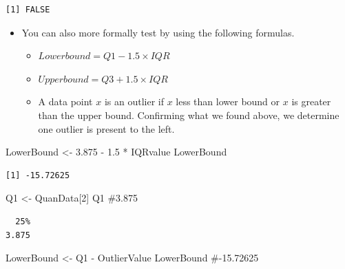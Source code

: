 \documentclass[
  letterpaper,
  DIV=11,
  numbers=noendperiod]{scrreprt}
\newenvironment{Shaded}{\begin{snugshade}}{\end{snugshade}}
\newcommand{\CommentTok}[1]{\textcolor[rgb]{0.37,0.37,0.37}{#1}}
\newcommand{\DecValTok}[1]{\textcolor[rgb]{0.68,0.00,0.00}{#1}}
\newcommand{\FloatTok}[1]{\textcolor[rgb]{0.68,0.00,0.00}{#1}}
\newcommand{\NormalTok}[1]{\textcolor[rgb]{0.00,0.23,0.31}{#1}}
\newcommand{\OtherTok}[1]{\textcolor[rgb]{0.00,0.23,0.31}{#1}}
\newcommand{\SpecialCharTok}[1]{\textcolor[rgb]{0.37,0.37,0.37}{#1}}
\providecommand{\tightlist}{%
  \setlength{\itemsep}{0pt}\setlength{\parskip}{0pt}}\usepackage{longtable,booktabs,array}
\begin{document}
\begin{verbatim}
[1] FALSE
\end{verbatim}

\begin{itemize}
\tightlist
\item
  You can also more formally test by using the following formulas.

  \begin{itemize}
  \tightlist
  \item
    \(Lower bound=Q1−1.5×IQR\)
  \item
    \(Upper bound=Q3+1.5×IQR\)
  \item
    A data point \(x\) is an outlier if \(x\) less than lower bound or
    \(x\) is greater than the upper bound. Confirming what we found
    above, we determine one outlier is present to the left.
  \end{itemize}
\end{itemize}

\begin{Shaded}
\begin{Highlighting}[]
\NormalTok{LowerBound }\OtherTok{\textless{}{-}} \FloatTok{3.875} \SpecialCharTok{{-}} \FloatTok{1.5} \SpecialCharTok{*}\NormalTok{ IQRvalue}
\NormalTok{LowerBound}
\end{Highlighting}
\end{Shaded}

\begin{verbatim}
[1] -15.72625
\end{verbatim}

\begin{Shaded}
\begin{Highlighting}[]
\NormalTok{Q1 }\OtherTok{\textless{}{-}}\NormalTok{ QuanData[}\DecValTok{2}\NormalTok{]}
\NormalTok{Q1  }\CommentTok{\#3.875}
\end{Highlighting}
\end{Shaded}

\begin{verbatim}
  25% 
3.875 
\end{verbatim}

\begin{Shaded}
\begin{Highlighting}[]
\NormalTok{LowerBound }\OtherTok{\textless{}{-}}\NormalTok{ Q1 }\SpecialCharTok{{-}}\NormalTok{ OutlierValue}
\NormalTok{LowerBound  }\CommentTok{\#{-}15.72625}
\end{Highlighting}
\end{Shaded}
\end{document}
